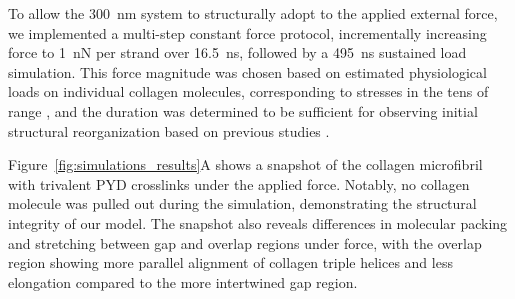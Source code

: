 \documentclass[10pt,letterpaper]{article}
\begin{document}
To allow the \SI{300}{\nano\meter} system to structurally adopt to the applied external force, we implemented a multi-step constant force protocol, incrementally increasing force to \SI{1}{\nano\N} per strand over \SI{16.5}{\nano\s}, followed by a \SI{495}{\nano\s} sustained load simulation. This force magnitude was chosen based on estimated physiological loads on individual collagen molecules, corresponding to stresses in the tens of \SI{}{\mega{}} range \cite{komi1990relevance}, and the duration was determined to be sufficient for observing initial structural reorganization based on previous studies \cite{zapp2020mechanoradicals}. 

Figure~\ref{fig:simulations_results}A shows a snapshot of the collagen microfibril with trivalent PYD crosslinks under the applied force. Notably, no collagen molecule was pulled out during the simulation, demonstrating the structural integrity of our model. The snapshot also reveals differences in molecular packing and stretching between gap and overlap regions under force, with the overlap region showing more parallel alignment of collagen triple helices and less elongation compared to the more intertwined gap region.
\end{document}
